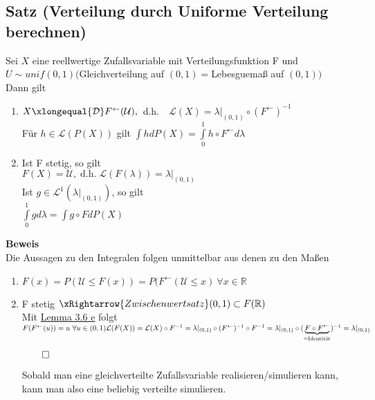 \documentclass[german,10pt,oneside, fleqn, a4paper]{article}
\newcommand {\R}	{\mathbb{R}}
\newcommand{\QED}{\begin{flushright}$\qed$\end{flushright}}
\newcommand{\mc}[1]{\mathcal{#1}}
\newcommand{\lp}[1]{\mc{L}^{#1}}
\newcommand{\beweis}{\textbf{Beweis}\\}
\newcommand{\1}[1]{1_{#1}}
\newcommand{\2}[1]{\1{\brac{#1}}}
\newcommand{\inv}{^\leftarrow}
\begin{document}
\subsection{Satz (Verteilung durch Uniforme Verteilung berechnen)}
\label{3.7}
Sei $X$ eine reellwertige Zufallsvariable mit Verteilungsfunktion F und\\
$U\sim unif(0,1) ($Gleichverteilung auf $(0,1)=$Lebesguemaß auf $(0,1))$\\
Dann gilt\begin{enumerate}[label=(\alph*)]
\item $X\xlongequal{\mc{D}}F\inv(\mc{U}),$\ d.h.\ \ $\mc{L}(X)=\lambda |_{(0,1)}\circ (F\inv)^{-1}$\\
Für $h\in\mc{L}(P(X))$ gilt $\int hdP(X)=\int\limits_0^1h\circ F\inv d\lambda$
\item Ist F stetig, so gilt\\
$F(X)=\mc{U},\;  \text{d.h.} \; \mc{L}(F(\lambda))=\lambda|_{(0,1)}$\\
Ist $g\in\lp{1}(\lambda|_{(0,1)})$, so gilt\\
$\int\limits_0^1gd\lambda=\int g\circ F dP(X)$
\end{enumerate}
\beweis
Die Aussagen zu den Integralen folgen unmittelbar aus denen zu den Maßen
\begin{enumerate}[label=(\alph*)]
\item $F(x)=P(\mc{U}\leq F(x))=P(F\inv(\mc{U}\leq x)\ \forall x\in\R$
\item F stetig $\xRightarrow{Zwischenwertsatz}(0,1)\subset F(\R)$\\
Mit \hyperref[3.6]{Lemma 3.6 e} folgt $F(F\inv(u))=u\ \forall u\in(0,1)\\
\mc{L}(F(X))=\mc{L}(X)\circ F^{-1}=\lambda|_{(0,1)}\circ(F\inv)^{-1}\circ F^{-1}\\
=\lambda|_{(0,1)}\circ (\underbrace{F\circ F\inv}_{\text{=Identität}})^{-1}=\lambda|_{(0,1)}$\QED
Sobald man eine gleichverteilte Zufallsvariable realisieren/simulieren kann, kann man also eine beliebig verteilte simulieren.
\end{enumerate}
\end{document}
